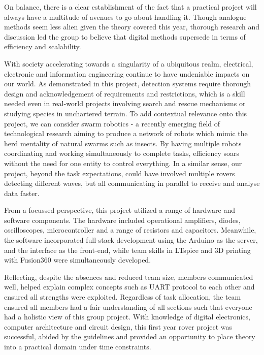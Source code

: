 On balance, there is a clear establishment of the fact that a practical project will always have a multitude of avenues to go about handling it. Though analogue methods seem less alien given the theory covered this year, thorough research and discussion led the group to believe that digital methods supersede in terms of efficiency and scalability.

With society accelerating towards a singularity of a ubiquitous realm, electrical, electronic and information engineering continue to have undeniable impacts on our world. As demonstrated in this project, detection systems require thorough design and acknowledgement of requirements and restrictions, which is a skill needed even in real-world projects involving search and rescue mechanisms or studying species in unchartered terrain. To add contextual relevance onto this project, we can consider swarm robotics - a recently emerging field of technological research aiming to produce a network of robots which mimic the herd mentality of natural swarms such as insects. By having multiple robots coordinating and working simultaneously to complete tasks, efficiency soars without the need for one entity to control everything. In a similar sense, our project, beyond the task expectations, could have involved multiple rovers detecting different waves, but all communicating in parallel to receive and analyse data faster.

From a focussed perspective, this project utilized a range of hardware and software components. The hardware included operational amplifiers, diodes, oscilloscopes, microcontroller and a range of resistors and capacitors. Meanwhile, the software incorporated full-stack development using the Arduino as the server, and the interface as the front-end, while team skills in LTspice and 3D printing with Fusion360 were simultaneously developed.

Reflecting, despite the absences and reduced team size, members communicated well, helped explain complex concepts such as UART protocol to each other and ensured all strengths were exploited. Regardless of task allocation, the team ensured all members had a fair understanding of all sections such that everyone had a holistic view of this group project. With knowledge of digital electronics, computer architecture and circuit design, this first year rover project was successful, abided by the guidelines and provided an opportunity to place theory into a practical domain under time constraints.